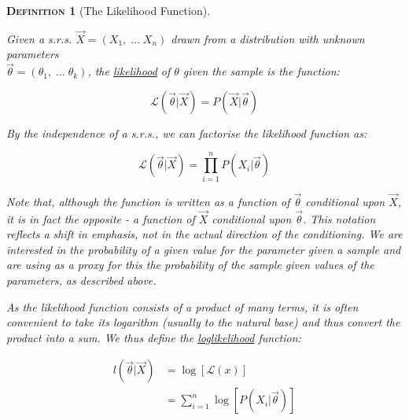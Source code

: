 \documentclass[12pt,a4paper]{article}
\newtheorem{definition}{\textsc{Definition}}[section]
\begin{document}
\begin{definition}[The Likelihood Function]$\;$\par\vspace{1cm}

Given a s.r.s. $\vec{X} = (X_1,\; \hdots\; X_n)$ drawn from a distribution with unknown parameters \\$\vec{\theta}=(\theta_1,\;\hdots\; \theta_k)$, the \underline{likelihood} of $\theta$ given the sample is the function:

$$\mathcal{L}(\vec{\theta} | \vec{X}) = P(\vec{X} | \vec{\theta})$$

\noindent By the independence of a s.r.s., we can factorise the likelihood function as:

$$\mathcal{L}(\vec{\theta} | \vec{X}) = \prod_{i=1}^n P(X_i | \vec{\theta})$$

Note that, although the function is written as a function of $\vec{\theta}$ conditional upon $\vec{X}$, it is in fact the opposite - a function of $\vec{X}$ conditional upon $\vec{\theta}$. This notation reflects a shift in emphasis, not in the actual direction of the conditioning. We are interested in the probability of a given value for the parameter given a sample and are using as a proxy for this the probability of the sample given values of the parameters, as described above.

As the likelihood function consists of a product of many terms, it is often convenient to take its logarithm (usually to the natural base) and thus convert the product into a sum. We thus define the \underline{loglikelihood} function:

\begin{align*}
l(\vec{\theta} | \vec{X}) &=\log[\mathcal{L}(x)]\\
&= \sum_{i=1}^n \log\left[P\left(X_i | \vec{\theta}\right)\right]
\end{align*}

\end{definition}
\end{document}
